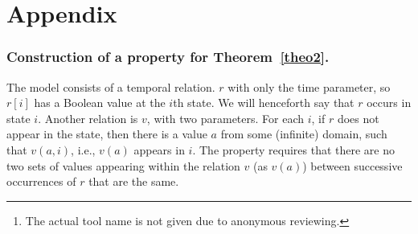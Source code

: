\documentclass{llncs}
\begin{document}
\begin{abstract}

Runtime Verification (RV) consists of analyzing execution 
traces using formal techniques. 
It includes monitoring the 
execution of a system against properties formulated in 
Linear Temporal Logic (LTL). 
LTL offers a succinct notation for writing useful 
specification properties. However, it is limited in 
expressiveness in the propositional case, and several 
theoretic extensions have therefore been proposed. Furthermore, for many practical cases, there is a need to monitor properties 
that carry data, where one can use formalisms like 
first-order LTL. We show that 
first-order LTL has similar expressiveness
limitations as the propositional version. We suggest here 
two related extensions for increasing the expressive power: 
one for propositional LTL and one for 
first-order LTL. These extensions have a simple incremental operational 
semantics that is more suitable for RV than previously 
suggested extensions. We show that the 
propositional extension has the same expressiveness as the 
classical extensions, and demonstrate its
adoption for runtime verification of first-order safety 
properties. Finally, we expand the BDD-based runtime verification 
tool \dejavu{}\footnote{The actual tool name is not given due to anonymous reviewing.}  to support our extension and perform some 
experiments.

\end{abstract}









\newpage
\appendix

\section{Appendix}


\subsubsection{Construction of a property
for Theorem~\ref{theo2}.}
The model consists of
a temporal relation.
$r$ with only the time parameter, so $r [ i ]$
has a Boolean value at the $i$th state. We will henceforth say that $r$ occurs
in state $i$. Another relation is $v$, with
two parameters. For each $i$, if $r$ does not appear in the
state, 
then there is a value $a$ from some (infinite) domain,
such that $v ( a, i )$, 
i.e., $v(a)$ appears in $i$.
The property requires that there are no two sets of values appearing within the relation $v$ (as $v(a)$) between successive occurrences of $r$ that are the same.
\end{document}
